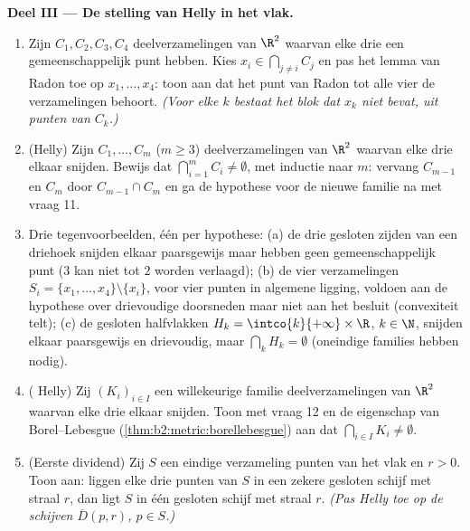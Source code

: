 \begin{problem}
\medskip
\noindent\textbf{Deel III --- De stelling van Helly in het vlak.}
\begin{enumerate}[resume]
  \item Zijn $C_1, C_2, C_3, C_4$  deelverzamelingen van
        $\R^2$ waarvan elke drie een gemeenschappelijk punt
        hebben. Kies $x_i \in \bigcap_{j \neq i} C_j$ en pas het
        lemma van Radon toe op $x_1, \dots, x_4$: toon aan dat het
        punt van Radon tot alle vier de verzamelingen behoort.
        \emph{(Voor elke $k$ bestaat het blok dat $x_k$ niet
        bevat, uit punten van $C_k$.)}
  \item (Helly) Zijn $C_1, \dots, C_m$ ($m \geq 3$) 
        deelverzamelingen van $\R^2$ waarvan elke drie elkaar
        snijden. Bewijs dat $\bigcap_{i=1}^m C_i \neq \emptyset$,
        met inductie naar $m$: vervang $C_{m-1}$ en $C_m$ door
        $C_{m-1} \cap C_m$ en ga de hypothese voor de nieuwe
        familie na met vraag 11.
  \item Drie tegenvoorbeelden, één per hypothese: (a) de drie
        gesloten zijden van een driehoek snijden elkaar
        paarsgewijs maar hebben geen gemeenschappelijk punt ($3$
        kan niet tot $2$ worden verlaagd); (b) de vier
        verzamelingen $S_i = \{x_1, \dots, x_4\} \setminus
        \{x_i\}$, voor vier punten in algemene ligging, voldoen
        aan de hypothese over drievoudige doorsneden maar niet aan
        het besluit (convexiteit telt); (c) de gesloten
        halfvlakken $H_k = \intco{k}{+\infty} \times \R$, $k \in
        \N$, snijden elkaar paarsgewijs en drievoudig, maar
        $\bigcap_k H_k = \emptyset$ (oneindige families hebben
         nodig).
  \item ( Helly) Zij $(K_i)_{i \in I}$ een willekeurige
        familie   deelverzamelingen van $\R^2$
        waarvan elke drie elkaar snijden. Toon met vraag 12 en de
        eigenschap van Borel--Lebesgue
        (\cref{thm:b2:metric:borellebesgue}) aan dat $\bigcap_{i
        \in I} K_i \neq \emptyset$.
  \item (Eerste dividend) Zij $S$ een eindige verzameling punten
        van het vlak en $r > 0$. Toon aan: liggen elke drie punten
        van $S$ in een zekere gesloten schijf met straal $r$, dan
        ligt $S$ in één gesloten schijf met straal $r$. \emph{(Pas
        Helly toe op de schijven $\overline D(p, r)$, $p \in S$.)}
\end{enumerate}


\end{problem}
